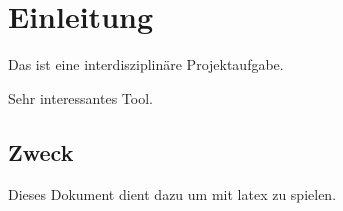 \documentclass[a4,paper,fleqn]{article}
\begin{document}


\tableofcontents

\newpage

\section{Einleitung}
Das ist eine interdisziplinäre Projektaufgabe. 

Sehr interessantes Tool.

\subsection{Zweck}
Dieses Dokument dient dazu um mit latex zu spielen.

\newpage

\listoffigures
\end{document}
